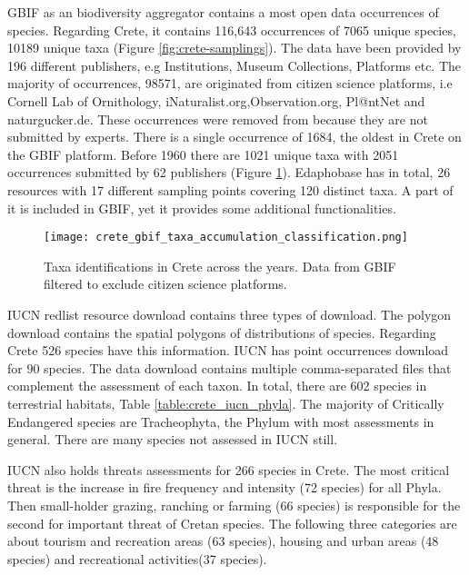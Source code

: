 GBIF as an biodiversity aggregator contains a most open data occurrences of species. 
Regarding Crete, it contains 116,643 occurrences of 7065 unique species,
10189 unique taxa (Figure \ref{fig:crete-samplings}). The data
have been provided by 196 different publishers, e.g Institutions, Museum Collections, Platforms etc.
The majority of occurrences, 98571, are originated from citizen science platforms, i.e 
Cornell Lab of Ornithology, iNaturalist.org,Observation.org, Pl@ntNet and naturgucker.de.
These occurrences were removed from because they are not submitted by experts.
There is a single occurrence of 1684, the oldest in Crete on the GBIF platform. Before 
1960 there are 1021 unique taxa with 2051 occurrences submitted by 62 publishers (Figure \ref{fig:crete_taxa_gbif}).
Edaphobase has in total, 26 resources with 17 different sampling points covering 120 distinct taxa.
A part of it is included in GBIF, yet it provides some additional functionalities. 

\begin{figure}[hbt!] 
    \centering\texttt{[image: crete\_gbif\_taxa\_accumulation\_classification.png]}
    \caption{Taxa identifications in Crete across the years. Data from GBIF filtered to exclude citizen science platforms.}
    \label{fig:crete_taxa_gbif}
\end{figure}

IUCN redlist resource download contains three types of download.
The polygon download contains the spatial polygons of distributions 
of species. Regarding Crete 526 species have this information.
IUCN has point occurrences download for 90 species. 
The data download contains multiple comma-separated files that 
complement the assessment of each taxon. In total, there are 602 species
in terrestrial habitats, Table \ref{table:crete_iucn_phyla}. 
The majority of Critically Endangered species are Tracheophyta, the Phylum
with most assessments in general. There are many species not assessed in IUCN still.

IUCN also holds threats assessments for 266 species in Crete. 
The most critical threat is the increase in fire frequency and intensity (72 species) 
for all Phyla. Then small-holder grazing, ranching or farming (66 species) is responsible
for the second for important threat of Cretan species. 
The following three categories are about tourism and recreation areas (63 species),
housing and urban areas (48 species) and recreational activities(37 species).

